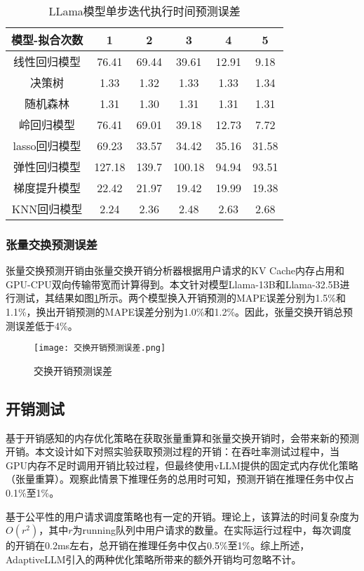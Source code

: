 \begin{table}[H]
  \centering
  \caption{LLama模型单步迭代执行时间预测误差}
  \label{Table:LLama模型单步迭代执行时间预测误差}
  \renewcommand{\arraystretch}{1.25}
  \small
  \begin{tabular}{c c c c c c}
    \toprule
    \textbf{模型-拟合次数} & \textbf{1} & \textbf{2} & \textbf{3} & \textbf{4} & \textbf{5} \\
    \midrule
    线性回归模型 & 76.41 & 69.44 & 39.61 & 12.91 & 9.18 \\ 
    决策树 & 1.33 & 1.32 & 1.33 & 1.33 & 1.34 \\ 
    随机森林 & 1.31 & 1.30 & 1.31 & 1.31 & 1.31 \\ 
    岭回归模型 & 76.41 & 69.01 & 39.18 & 12.73 & 7.72 \\ 
    lasso回归模型 & 69.23 & 33.57 & 34.42 & 35.16 & 31.58  \\ 
    弹性回归模型 & 127.18 & 139.7 & 100.18 & 94.94 & 93.51  \\ 
    梯度提升模型 & 22.42 & 21.97 & 19.42 & 19.99 & 19.38  \\ 
    KNN回归模型 & 2.24 & 2.36 & 2.48 & 2.63 & 2.68 \\ 
    \bottomrule
  \end{tabular}
\end{table}


\subsubsection{张量交换预测误差}

张量交换预测开销由张量交换开销分析器根据用户请求的KV Cache内存占用和GPU-CPU双向传输带宽而计算得到。本文针对模型Llama-13B和Llama-32.5B进行测试，其结果如图\ref{Fig:交换开销预测误差}所示。两个模型换入开销预测的MAPE误差分别为1.5\%和1.1\%，换出开销预测的MAPE误差分别为1.0\%和1.2\%。因此，张量交换开销总预测误差低于4\%。

\begin{figure}[!htbp]
  \centering
  \texttt{[image: 交换开销预测误差.png]}
  \caption{交换开销预测误差}
  \label{Fig:交换开销预测误差}
\end{figure}

\subsection{开销测试}

基于开销感知的内存优化策略在获取张量重算和张量交换开销时，会带来新的预测开销。本文设计如下对照实验获取预测过程的开销：在吞吐率测试过程中，当GPU内存不足时调用开销比较过程，但最终使用vLLM提供的固定式内存优化策略（张量重算）。观察此情景下推理任务的总用时可知，预测开销在推理任务中仅占0.1\%至1\%。

基于公平性的用户请求调度策略也有一定的开销。理论上，该算法的时间复杂度为$O(r^2)$，其中$r$为running队列中用户请求的数量。在实际运行过程中，每次调度的开销在0.2ms左右，总开销在推理任务中仅占0.5\%至1\%。综上所述，AdaptiveLLM引入的两种优化策略所带来的额外开销均可忽略不计。
